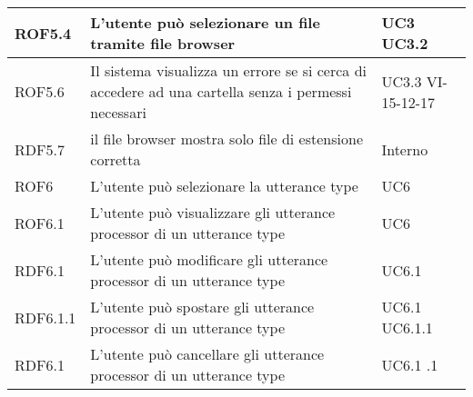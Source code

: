 \documentclass[../AnalisideiRequisiti.tex]{subfiles}
\begin{document}
\begin{longtable}{| p{3cm} | p{6cm} | p{3cm} |}
		\newline ROF5.4&
		\newline L'utente può selezionare un file tramite file browser&
		\newline UC3 \newline UC3.2
		\\[1em]	
		\hline
		
		
		\newline ROF5.6&
		\newline Il sistema visualizza un errore se si cerca di accedere ad una cartella senza i permessi necessari&
		\newline UC3.3 \newline VI-15-12-17
		\\[1em]	
		\hline
		\newline RDF5.7&
		\newline il file browser mostra solo file di estensione corretta&
		\newline Interno
		\\[1em]
		\hline
		\newline ROF6&
		\newline L'utente può selezionare la utterance type&
		\newline UC6 
		\\[1em]
		\hline
				
		\newline ROF6.1&
		\newline L'utente può visualizzare gli utterance processor di un utterance type&
		\newline UC6 
		\\[1em]
		\hline
				
		\newline RDF6.1&
		\newline L'utente può modificare gli utterance processor di un utterance type&
		\newline UC6.1
		\\[1em]
		\hline	
				
		\newline RDF6.1.1&
		\newline L'utente può spostare gli utterance processor di un utterance type&
		\newline UC6.1 \newline UC6.1.1
		\\[1em]
		\hline	
				
		\newline RDF6.1&
		\newline L'utente può cancellare gli utterance processor di un utterance type&
		\newline UC6.1 \newline 6.1.1
		\\[1em]
		\hline	
		

\end{longtable}
\end{document}
